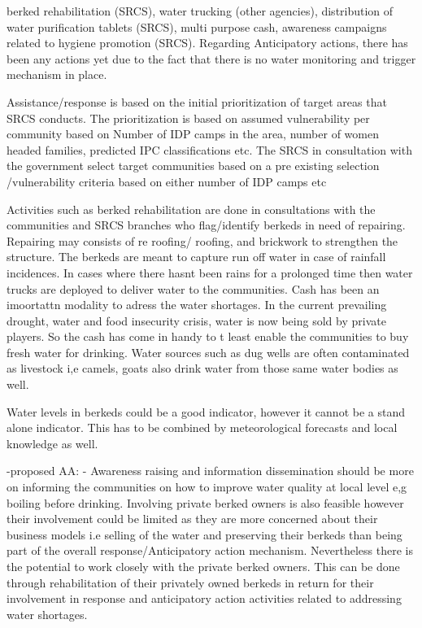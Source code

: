 berked rehabilitation (SRCS), water trucking (other agencies), distribution of water purification tablets (SRCS), multi purpose cash, awareness campaigns related to hygiene promotion (SRCS). Regarding Anticipatory actions, there has been any actions yet due to the fact that there is no water monitoring and trigger mechanism in place.

Assistance/response is based on the initial prioritization of target areas that SRCS conducts. The prioritization is based on assumed vulnerability per community based on Number of IDP camps in the area, number of women headed families, predicted IPC classifications etc.
The SRCS in consultation with the government select target communities based on a pre existing selection /vulnerability criteria based on either number of IDP camps etc


Activities such as berked rehabilitation are done in consultations with the communities and SRCS branches who flag/identify berkeds in need of repairing. Repairing may consists of re roofing/ roofing, and brickwork to strengthen the structure. The berkeds are meant to capture run off water in case of rainfall incidences. In cases where there hasnt been rains for a prolonged time then water trucks are deployed to deliver water to the communities. Cash has been an imoortattn modality to adress the water shortages. In the current prevailing drought, water and food insecurity crisis, water is now being sold by private players. So the cash has come in handy to t least enable the communities to buy fresh water for drinking. Water sources such as dug wells are often contaminated as livestock i,e camels, goats also drink water from those same water bodies as well.

Water levels in berkeds could be a good indicator, however it cannot be a stand alone indicator. This has to be combined by meteorological forecasts and local knowledge as well.

-proposed AA:
-	Awareness raising and information dissemination should be more on informing the communities on how to improve water quality at local level e,g boiling before drinking. Involving private berked owners is also feasible however their involvement could be limited as they are more concerned about their business models i.e selling of the water and preserving their berkeds than being part of the overall response/Anticipatory action mechanism. Nevertheless there is the potential to work closely with the private berked owners. This can be done through rehabilitation of their privately owned berkeds in return for their involvement in response and anticipatory action activities related to addressing water shortages.


